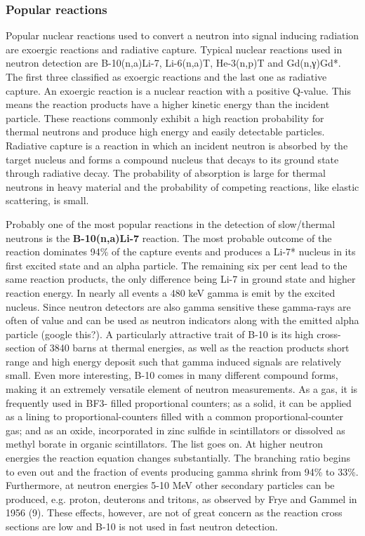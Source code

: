 \subsubsection{Popular reactions}
Popular nuclear reactions used to convert a neutron into signal inducing radiation are exoergic reactions and radiative capture. Typical nuclear reactions used in neutron detection are B-10(n,a)Li-7, Li-6(n,a)T, He-3(n,p)T and Gd(n,γ)Gd*. The first three classified as exoergic reactions and the last one as radiative capture.
An exoergic reaction is a nuclear reaction with a positive Q-value. This means the reaction products have a higher kinetic energy than the incident particle. These reactions commonly exhibit a high reaction probability for thermal neutrons and produce high energy and easily detectable particles.
Radiative capture is a reaction in which an incident neutron is absorbed by the target nucleus and forms a compound nucleus that decays to its ground state through radiative decay. The probability of absorption is large for thermal neutrons in heavy material and the probability of competing reactions, like elastic scattering, is small. \newline

Probably one of the most popular reactions in the detection of slow/thermal neutrons is the {\bf B-10(n,a)Li-7} reaction. The most probable outcome of the reaction dominates 94\% of the capture events and produces a Li-7* nucleus in its first excited state and an alpha particle. The remaining six per cent lead to the same reaction products, the only difference being Li-7 in ground state and higher reaction energy.
In nearly all events a 480 keV gamma is emit by the excited nucleus. Since neutron detectors are also gamma sensitive these gamma-rays are often of value and can be used as neutron indicators along with the emitted alpha particle (google this?).
A particularly attractive trait of B-10 is its high cross-section of 3840 barns at thermal energies, as well as the reaction products short range and high energy deposit such that gamma induced signals are relatively small. Even more interesting, B-10 comes in many different compound forms, making it an extremely versatile element of neutron measurements. As a gas, it is frequently used in BF3- filled proportional counters; as a solid, it can be applied as a lining to proportional-counters filled with a common proportional-counter gas; and as an oxide, incorporated in zinc sulfide in scintillators or dissolved as methyl borate in organic scintillators. The list goes on.
At higher neutron energies the reaction equation changes substantially. The branching ratio begins to even out and the fraction of events producing gamma shrink from 94\% to 33\%. Furthermore, at neutron energies 5-10 MeV other secondary particles can be produced, e.g. proton, deuterons and tritons, as observed by Frye and Gammel in 1956 (9). These effects, however, are not of great concern as the reaction cross sections are low and B-10 is not used in fast neutron detection. \newline

